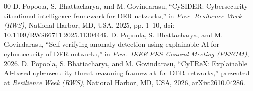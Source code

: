 \documentclass[journal]{IEEEtran}
\begin{document}
\begin{thebibliography}{00}
 D. Popoola, S. Bhattacharya, and M. Govindarasu, ``CySIDER: Cybersecurity situational intelligence framework for DER networks,'' in \emph{Proc. Resilience Week (RWS)}, National Harbor, MD, USA, 2025, pp. 1--10, doi: 10.1109/RWS66711.2025.11304446.
 D. Popoola, S. Bhattacharya, and M. Govindarasu, ``Self-verifying anomaly detection using explainable AI for cybersecurity of DER networks,'' in \emph{Proc. IEEE PES General Meeting (PESGM)}, 2026.
 D. Popoola, S. Bhattacharya, and M. Govindarasu, ``CyTReX: Explainable AI-based cybersecurity threat reasoning framework for DER networks,'' presented at \emph{Resilience Week (RWS)}, National Harbor, MD, USA, 2026, arXiv:2610.04286.
\end{thebibliography}
\end{document}
